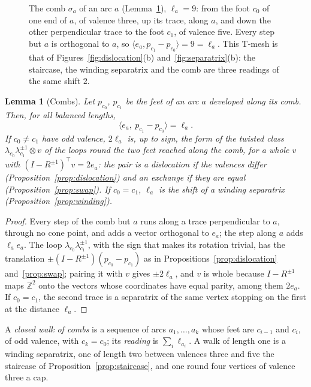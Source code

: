 \documentclass[11pt,a4paper]{article}
\newtheorem{lemma}{Lemma}
\newcommand{\Z}{\mathbb{Z}}
\begin{document}
\begin{figure}[t]
\centering

\caption{The comb $\sigma_a$ of an arc $a$ (Lemma~\ref{lem:comb}), $\ell_a =
9$: from the foot $c_0$ of one end of $a$, of valence three, up its trace,
along $a$, and down the other perpendicular trace to the foot $c_1$, of
valence five. Every step but $a$ is orthogonal to $a$, so $\langle e_a,
p_{c_1} - p_{c_0} \rangle = 9 = \ell_a$. This T-mesh is that of
Figures~\ref{fig:dislocation}(b) and~\ref{fig:separatrix}(b): the staircase,
the winding separatrix and the comb are three readings of the same shift
$2$.}
\label{fig:comb}
\end{figure}

\begin{lemma}[Combs]\label{lem:comb}
Let $p_{c_0}$, $p_{c_1}$ be the feet of an arc $a$ developed along its comb.
Then, for all balanced lengths,
\[
  \langle e_a,\ p_{c_1} - p_{c_0} \rangle = \ell_a .
\]
If $c_0 \neq c_1$ have odd valence, $2\ell_a$ is, up to sign, the form of the
twisted class $\lambda_{c_0}\lambda_{c_1}^{\pm1} \otimes v$ of the loops round
the two feet reached along the comb, for a whole $v$ with $(I - R^{\pm1})^\top v
= 2e_a$: the pair is a dislocation if the valences differ
(Proposition~\ref{prop:dislocation}) and an exchange if they are equal
(Proposition~\ref{prop:swap}). If $c_0 = c_1$, $\ell_a$ is the shift of a
winding separatrix (Proposition~\ref{prop:winding}).
\end{lemma}

\begin{proof}
Every step of the comb but $a$ runs along a trace perpendicular to $a$, through
no cone point, and adds a vector orthogonal to $e_a$; the step along $a$ adds
$\ell_a e_a$. The loop $\lambda_{c_0} \lambda_{c_1}^{\pm1}$, with the sign that
makes its rotation trivial, has the translation $\pm(I - R^{\pm1})(p_{c_0} -
p_{c_1})$ as in Propositions~\ref{prop:dislocation} and~\ref{prop:swap};
pairing it with $v$ gives $\pm 2\ell_a$, and $v$ is whole because $I -
R^{\pm1}$ maps $\Z^2$ onto the vectors whose coordinates have equal parity,
among them $2e_a$. If $c_0 = c_1$, the second trace is a separatrix of the same
vertex stopping on the first at the distance $\ell_a$.
\end{proof}

A \emph{closed walk of combs} is a sequence of arcs $a_1, \dots, a_k$ whose
feet are $c_{i-1}$ and $c_i$, of odd valence, with $c_k = c_0$; its
\emph{reading} is $\sum_i \ell_{a_i}$. A walk of length one is a winding
separatrix, one of length two between valences three and five the staircase of
Proposition~\ref{prop:staircase}, and one round four vertices of valence three
a cap.
\end{document}

